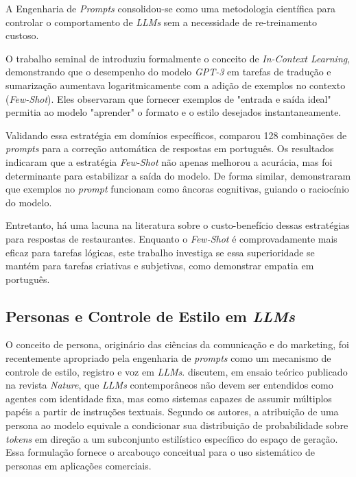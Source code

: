 \documentclass[12pt, a4paper]{article}
\numberwithin{equation}{section}
\begin{document}
A Engenharia de \textit{Prompts} consolidou-se como uma metodologia científica para controlar o comportamento de \textit{LLMs} sem a necessidade de re-treinamento custoso.

O trabalho seminal de \cite{brown2020language} introduziu formalmente o conceito de \textit{In-Context Learning}, demonstrando que o desempenho do modelo \textit{GPT-3} em tarefas de tradução e sumarização aumentava logaritmicamente com a adição de exemplos no contexto (\textit{Few-Shot}). Eles observaram que fornecer exemplos de "entrada e saída ideal" permitia ao modelo "aprender" o formato e o estilo desejados instantaneamente.

Validando essa estratégia em domínios específicos, \cite{mello2024prompt} comparou 128 combinações de \textit{prompts} para a correção automática de respostas em português. Os resultados indicaram que a estratégia \textit{Few-Shot} não apenas melhorou a acurácia, mas foi determinante para estabilizar a saída do modelo. De forma similar, \cite{wei2022Chain} demonstraram que exemplos no \textit{prompt} funcionam como âncoras cognitivas, guiando o raciocínio do modelo.

Entretanto, há uma lacuna na literatura sobre o custo-benefício dessas estratégias para respostas de restaurantes. Enquanto o \textit{Few-Shot} é comprovadamente mais eficaz para tarefas lógicas, este trabalho investiga se essa superioridade se mantém para tarefas criativas e subjetivas, como demonstrar empatia em português.

\subsection{Personas e Controle de Estilo em \textit{LLMs}}

O conceito de persona, originário das ciências da comunicação e do marketing, foi recentemente apropriado pela engenharia de \textit{prompts} como um mecanismo de controle de estilo, registro e voz em \textit{LLMs}.  discutem, em ensaio teórico publicado na revista \textit{Nature}, que \textit{LLMs} contemporâneos não devem ser entendidos como agentes com identidade fixa, mas como sistemas capazes de assumir múltiplos papéis a partir de instruções textuais. Segundo os autores, a atribuição de uma persona ao modelo equivale a condicionar sua distribuição de probabilidade sobre \textit{tokens} em direção a um subconjunto estilístico específico do espaço de geração. Essa formulação fornece o arcabouço conceitual para o uso sistemático de personas em aplicações comerciais.
\end{document}
